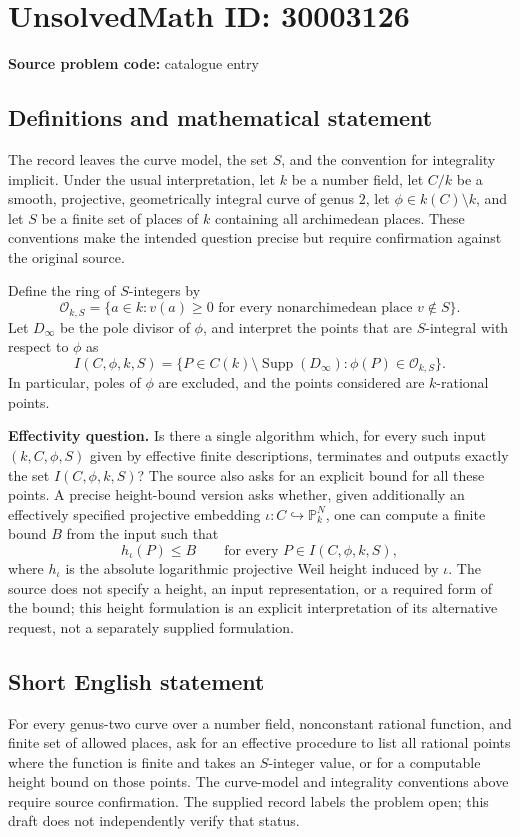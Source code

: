 \documentclass[11pt]{article}
\newcommand{\PP}{\mathbb{P}}
\begin{document}
\section*{UnsolvedMath ID: 30003126}
\textbf{Source problem code:} catalogue entry
\subsection{Definitions and mathematical statement}
The record leaves the curve model, the set \(S\), and the convention for integrality implicit. Under the usual interpretation, let \(k\) be a number field, let \(C/k\) be a smooth, projective, geometrically integral curve of genus \(2\), let \(\phi\in k(C)\setminus k\), and let \(S\) be a finite set of places of \(k\) containing all archimedean places. These conventions make the intended question precise but require confirmation against the original source.

Define the ring of \(S\)-integers by
\[
\mathcal O_{k,S}=\{a\in k: v(a)\geq 0\text{ for every nonarchimedean place }v\notin S\}.
\]
Let \(D_\infty\) be the pole divisor of \(\phi\), and interpret the points that are \(S\)-integral with respect to \(\phi\) as
\[
I(C,\phi,k,S)=\{P\in C(k)\setminus\operatorname{Supp}(D_\infty):\phi(P)\in\mathcal O_{k,S}\}.
\]
In particular, poles of \(\phi\) are excluded, and the points considered are \(k\)-rational points.

\textbf{Effectivity question.} Is there a single algorithm which, for every such input \((k,C,\phi,S)\) given by effective finite descriptions, terminates and outputs exactly the set \(I(C,\phi,k,S)\)? The source also asks for an explicit bound for all these points. A precise height-bound version asks whether, given additionally an effectively specified projective embedding \(\iota:C\hookrightarrow\PP^N_k\), one can compute a finite bound \(B\) from the input such that
\[
 h_{\iota}(P)\leq B\qquad\text{for every }P\in I(C,\phi,k,S),
\]
where \(h_{\iota}\) is the absolute logarithmic projective Weil height induced by \(\iota\). The source does not specify a height, an input representation, or a required form of the bound; this height formulation is an explicit interpretation of its alternative request, not a separately supplied formulation.
\subsection{Short English statement}
For every genus-two curve over a number field, nonconstant rational function, and finite set of allowed places, ask for an effective procedure to list all rational points where the function is finite and takes an \(S\)-integer value, or for a computable height bound on those points. The curve-model and integrality conventions above require source confirmation. The supplied record labels the problem open; this draft does not independently verify that status.
\end{document}
